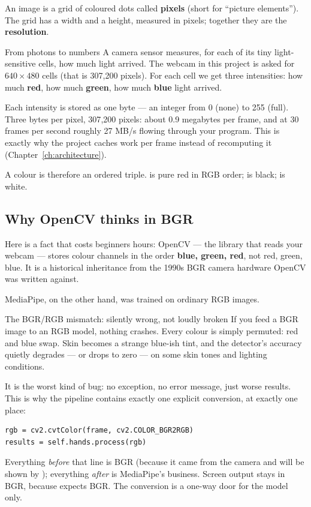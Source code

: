 An image is a grid of coloured dots called \textbf{pixels} (short for ``picture elements''). The
grid has a width and a height, measured in pixels; together they are the \textbf{resolution}.

\begin{mlconcept}{From photons to numbers}
A camera sensor measures, for each of its tiny light-sensitive cells, how much light arrived. The
webcam in this project is asked for $640 \times 480$ cells (that is 307{,}200 pixels). For each cell
we get three intensities: how much \textbf{red}, how much \textbf{green}, how much \textbf{blue} light
arrived.

Each intensity is stored as one byte --- an integer from 0 (none) to 255 (full). Three bytes per
pixel, 307{,}200 pixels: about 0.9 megabytes per frame, and at 30 frames per second roughly
27 MB/s flowing through your program. This is exactly why the project caches work per frame
instead of recomputing it (Chapter~\ref{ch:architecture}).

A colour is therefore an ordered triple.  is pure red in RGB order;
 is black;  is white.
\end{mlconcept}

\subsection{Why OpenCV thinks in BGR}

Here is a fact that costs beginners hours: OpenCV --- the library that reads your webcam --- stores
colour channels in the order \textbf{blue, green, red}, not red, green, blue. It is a historical
inheritance from the 1990s BGR camera hardware OpenCV was written against.

MediaPipe, on the other hand, was trained on ordinary RGB images.

\begin{edgetrap}{The BGR/RGB mismatch: silently wrong, not loudly broken}
If you feed a BGR image to an RGB model, nothing crashes. Every colour is simply permuted: red and
blue swap. Skin becomes a strange blue-ish tint, and the detector's accuracy quietly degrades --- or
drops to zero --- on some skin tones and lighting conditions.

It is the worst kind of bug: no exception, no error message, just worse results. This is why the
pipeline contains exactly one explicit conversion, at exactly one place:

\begin{lstlisting}
rgb = cv2.cvtColor(frame, cv2.COLOR_BGR2RGB)
results = self.hands.process(rgb)
\end{lstlisting}

Everything {\em before} that line is BGR (because it came from the camera and will be shown by
); everything {\em after} is MediaPipe's business. Screen output stays in BGR,
because  expects BGR. The conversion is a one-way door for the model only.
\end{edgetrap}


